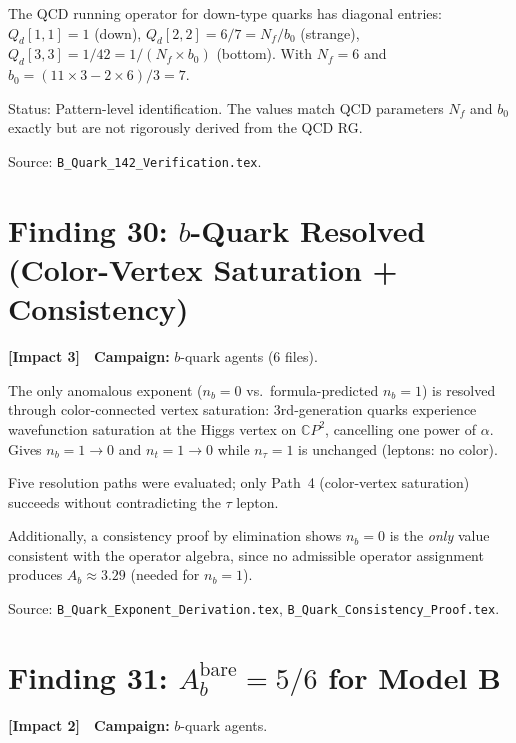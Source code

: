 \documentclass[11pt,a4paper]{article}
\newcommand{\impactthree}{\textcolor{impact3}{\textbf{[Impact 3]}}}
\newcommand{\impacttwo}{\textcolor{impact2}{\textbf{[Impact 2]}}}
\newcommand{\CP}{\mathbb{C}P}
\begin{document}
The QCD running operator for down-type quarks has diagonal entries:
$Q_d[1,1] = 1$ (down), $Q_d[2,2] = 6/7 = N_f/b_0$ (strange),
$Q_d[3,3] = 1/42 = 1/(N_f \times b_0)$ (bottom).
With $N_f = 6$ and $b_0 = (11 \times 3 - 2 \times 6)/3 = 7$.

Status: Pattern-level identification. The values match QCD parameters
$N_f$ and $b_0$ exactly but are not rigorously derived from the QCD RG.

Source: \texttt{B\_Quark\_142\_Verification.tex}.


\section{Finding 30: $b$-Quark Resolved (Color-Vertex Saturation + Consistency)}
\label{sec:b-quark}

\impactthree\ \ \textbf{Campaign:} $b$-quark agents (6 files).

The only anomalous exponent ($n_b = 0$ vs.\ formula-predicted $n_b = 1$)
is resolved through color-connected vertex saturation: 3rd-generation
quarks experience wavefunction saturation at the Higgs vertex on $\CP^2$,
cancelling one power of $\alpha$. Gives $n_b = 1 \to 0$ and $n_t = 1 \to 0$
while $n_\tau = 1$ is unchanged (leptons: no color).

Five resolution paths were evaluated; only Path~4 (color-vertex saturation)
succeeds without contradicting the $\tau$ lepton.

Additionally, a consistency proof by elimination shows $n_b = 0$ is the
\emph{only} value consistent with the operator algebra, since no admissible
operator assignment produces $A_b \approx 3.29$ (needed for $n_b = 1$).

Source: \texttt{B\_Quark\_Exponent\_Derivation.tex},
\texttt{B\_Quark\_Consistency\_Proof.tex}.


\section{Finding 31: $A_b^{\mathrm{bare}} = 5/6$ for Model B}
\label{sec:Ab-modelB}

\impacttwo\ \ \textbf{Campaign:} $b$-quark agents.
\end{document}
